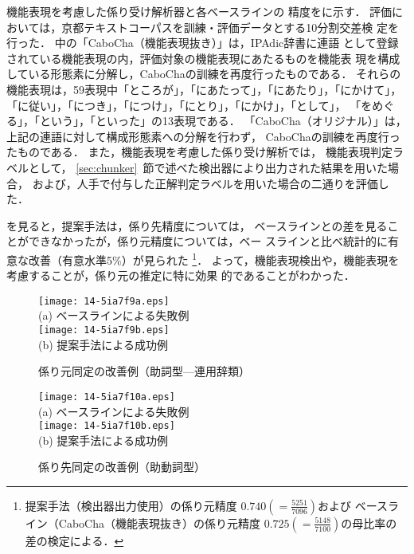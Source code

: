 \documentclass[japanese]{jnlp_1.3e}
\begin{document}
機能表現を考慮した係り受け解析器と各ベースラインの
精度をに示す．
評価においては，京都テキストコーパスを訓練・評価データとする10分割交差検
定を行った．
中の「CaboCha（機能表現抜き）」は，IPAdic辞書に連語
として登録されている機能表現の内，評価対象の機能表現にあたるものを機能表
現を構成している形態素に分解し，CaboChaの訓練を再度行ったものである．
それらの機能表現は，59表現中「ところが」，「にあたって」，「にあたり」，「にかけて」，
「に従い」，「につき」，「につけ」，「にとり」，「にかけ」，「として」，
「をめぐる」，「という」，「といった」の13表現である．
「CaboCha（オリジナル）」は，上記の連語に対して構成形態素への分解を行わず，
CaboChaの訓練を再度行ったものである．
また，機能表現を考慮した係り受け解析では，
機能表現判定ラベルとして，
\ref{sec:chunker}~節で述べた検出器により出力された結果を用いた場合，
および，人手で付与した正解判定ラベルを用いた場合の二通りを評価した．

を見ると，提案手法は，係り先精度については，
ベースラインとの差を見ることができなかったが，係り元精度については，ベー
スラインと比べ統計的に有意な改善（有意水準5\%）が見られた
\footnote{
  提案手法（検出器出力使用）の係り元精度
  $0.740(=\frac{5251}{7096})$および
  ベースライン（CaboCha（機能表現抜き）の係り元精度
  $0.725(=\frac{5148}{7100})$の母比率の差の検定による．
}．
よって，機能表現検出や，機能表現を考慮することが，係り元の推定に特に効果
的であることがわかった．


\begin{figure}[b]
\begin{center}
\texttt{[image: 14-5ia7f9a.eps]}\\
 (a) ベースラインによる失敗例\\[.2cm] 
\texttt{[image: 14-5ia7f9b.eps]}\\
 (b) 提案手法による成功例
\end{center}
 \caption{係り元同定の改善例（助詞型—連用辞類）}
 \label{depended_sample}
\end{figure}
\begin{figure}[b]
\begin{center}
\texttt{[image: 14-5ia7f10a.eps]}\\
 (a) ベースラインによる失敗例\\[.2cm] 
\texttt{[image: 14-5ia7f10b.eps]}\\
 (b) 提案手法による成功例
\end{center}
 \caption{係り先同定の改善例（助動詞型）}
 \label{depend_sample}
\end{figure}
\end{document}
